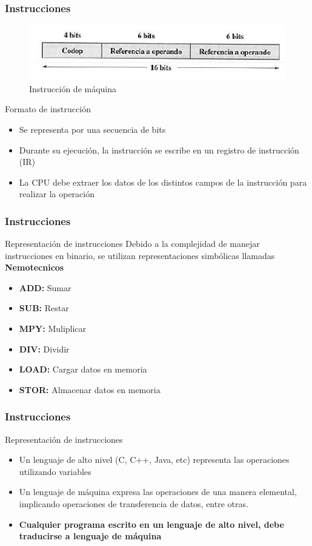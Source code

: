\documentclass{beamer}
\begin{document}
\begin{frame}
	\frametitle{Instrucciones}
	\begin{figure}[H]
	\centering
	\includegraphics[scale=0.8]{imagenes/formatoinstruccion.jpg}
	\caption{Instrucción de máquina}
	\end{figure}
	\begin{block}{Formato de instrucción}
		\begin{itemize}
			\item Se representa por una secuencia de bits
			\item Durante su ejecución, la instrucción se escribe en un registro de instrucción (IR)
			\item La CPU debe extraer los datos de los distintos campos de la instrucción para realizar la operación
		\end{itemize}
	\end{block}		 		
\end{frame}


\begin{frame}
	\frametitle{Instrucciones}
	\begin{block}{Representación de instrucciones}
	Debido a la complejidad de manejar instrucciones en binario, se utilizan representaciones simbólicas llamadas \textbf{Nemotecnicos}
		\begin{itemize}
			\item \textbf{ADD:} Sumar
			\item \textbf{SUB:} Restar
			\item \textbf{MPY:} Muliplicar
			\item \textbf{DIV:} Dividir
			\item \textbf{LOAD:} Cargar datos en memoria
			\item \textbf{STOR:} Almacenar datos en memoria
		\end{itemize}
	\end{block}		 		
\end{frame}

\begin{frame}
	\frametitle{Instrucciones}
	\begin{block}{Representación de instrucciones}
		\begin{itemize}
			\item Un lenguaje de alto nivel (C, C++, Java, etc) representa las operaciones utilizando variables
			\item Un lenguaje de máquina expresa las operaciones de una manera elemental, implicando operaciones de transferencia de datos, entre otras.
			\item \textbf{Cualquier programa escrito en un lenguaje de alto nivel, debe traducirse a lenguaje de máquina}
		\end{itemize}
	\end{block}		 		
\end{frame}
\end{document}
